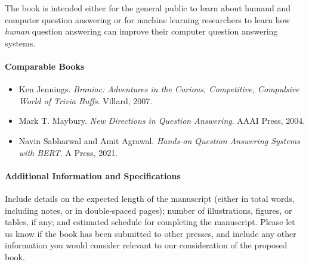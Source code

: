 The book is intended either for the general public to learn about humand and computer
question answering or for machine learning researchers to learn
how \emph{human} question answering can improve their computer question
answering systems.

\paragraph{Comparable Books}

\begin{itemize}
        \item Ken Jennings.  \textit{Braniac: Adventures in the Curious,
        Competitive, Compulsive World of Trivia Buffs}.  Villard, 2007.

        \item Mark T. Maybury.  \textit{New Directions in Question
        Answering}.  AAAI Press, 2004.

        \item Navin Sabharwal and Amit Agrawal.  \textit{Hands-on Question
        Answering Systems with BERT}.  A Press, 2021.
\end{itemize}


\paragraph{Additional Information and Specifications}

Include details on the expected length of the manuscript (either in total
words, including notes, or in double-spaced pages); number of illustrations,
figures, or tables, if any; and estimated schedule for completing the
manuscript. Please let us know if the book has been submitted to other
presses, and include any other information you would consider relevant to our
consideration of the proposed book.
